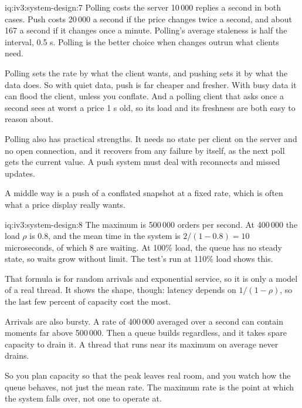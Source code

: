 \begin{solution}{iq:iv3:system-design:7}
Polling costs the server 10\,000 replies a second in both cases. Push costs 20\,000 a second if the price changes twice a second, and about 167 a second if it changes once a minute. Polling's average staleness is half the interval, 0.5 s. Polling is the better choice when changes outrun what clients need.

Polling sets the rate by what the client wants, and pushing sets it by what the data does. So with quiet data, push is far cheaper and fresher. With busy data it can flood the client, unless you conflate. And a polling client that asks once a second sees at worst a price 1 s old, so its load and its freshness are both easy to reason about.

Polling also has practical strengths. It needs no state per client on the server and no open connection, and it recovers from any failure by itself, as the next poll gets the current value. A push system must deal with reconnects and missed updates.

A middle way is a push of a conflated snapshot at a fixed rate, which is often what a price display really wants.

\end{solution}

\begin{solution}{iq:iv3:system-design:8}
The maximum is 500\,000 orders per second. At 400\,000 the load $\rho$ is 0.8, and the mean time in the system is $2 / (1 - 0.8) = 10$ microseconds, of which 8 are waiting. At 100\% load, the queue has no steady state, so waits grow without limit. The test's run at 110\% load shows this.

That formula is for random arrivals and exponential service, so it is only a model of a real thread. It shows the shape, though: latency depends on $1 / (1 - \rho)$, so the last few percent of capacity cost the most.

Arrivals are also bursty. A rate of 400\,000 averaged over a second can contain moments far above 500\,000. Then a queue builds regardless, and it takes spare capacity to drain it. A thread that runs near its maximum on average never drains.

So you plan capacity so that the peak leaves real room, and you watch how the queue behaves, not just the mean rate. The maximum rate is the point at which the system falls over, not one to operate at.

\end{solution}

